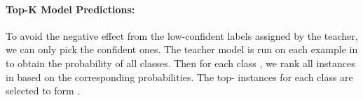 \documentclass[11pt,a4paper]{article}
\begin{document}
\begin{comment}
\paragraph{Top-K Semantic Relatedness}  
To avoid out-of-domain examples, we can select examples in  that are more semantically similar to .
This purpose can be achieved by the following two methods:
(1) for each example , we iterate over all examples in , and obtain  the top-K examples  that are most semantically relevant to .  
We form a new  by 
 combining the top-K related examples for all instances in , with psudo labels assigned by the model trained on ; and 
 (2) we can train a language model on , and select the in-domain data from  with lowest perplexity scores. 
Similarly, the labels for the selected examples are given by the model trained on . 

Apparently, selecting in-domain data can significantly alleviate the issue with out-of-domain data, but might suffer from the incorrect labels. 
\end{comment}
\paragraph{Top-K Model Predictions:} To avoid the negative effect from the 
low-confident 
 labels assigned by the teacher, we can only pick the confident ones. 
The teacher  model  is run on each example in  to obtain the probability of all classes. 
Then for each class , we rank all instances in  based on the corresponding probabilities. The top- instances for each class are selected to form  . 


\begin{comment}
This strategy provides guarantees that the model has  confidence on the selected examples. But given the   fragile nature of neural models\footnote{e.g., predictions of neural models can be flipped with human-indistinguishable perturbations \citep{pmlr-v70-arjovsky17a,mirza2014conditional,ijcai2018-601,liang2017deep,ebrahimi2017hotflip}.}, and the situation where  is extremely large and noisy, it is hard to  
guarantee the correctness of model predictions on these high-confident examples. 
\paragraph{Combing Semantic Relatedness and Model Predictions}
To take the complementary strengths of both above strategies, we can combine them, in which the selected example in  should be both semantic related to the training set and is assigned a relatively confident score by the model trained on . 
\end{comment}
\end{document}
